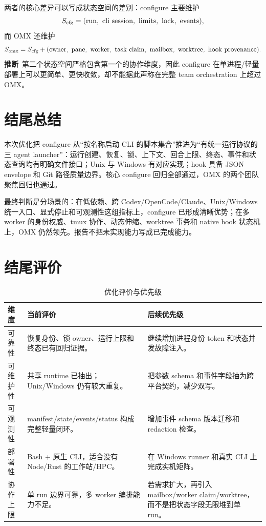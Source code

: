 \documentclass[UTF8,a4paper,11pt]{ctexart}
\newcommand{\inferred}{\textcolor{accent}{\textbf{推断}}}
\begin{document}
两者的核心差异可以写成状态空间的差别：configure 主要维护
\begin{equation}
  S_{\rm cfg}=({\rm run},\ {\rm cli\ session},\ {\rm limits},\ {\rm lock},\ {\rm events}),
\end{equation}
而 OMX 还维护
\begin{equation}
  S_{\rm omx}=S_{\rm cfg}+({\rm owner},\ {\rm pane},\ {\rm worker},\ {\rm task\ claim},\ {\rm mailbox},\ {\rm worktree},\ {\rm hook\ provenance}).
\end{equation}
\inferred\ 第二个状态空间严格包含第一个的协作维度，因此 configure 在单进程/轻量部署上可以更简单、更快收敛，却不能据此声称在完整 team orchestration 上超过 OMX。

\section{结尾总结}
本次优化把 configure 从“按名称启动 CLI 的脚本集合”推进为“有统一运行协议的三 agent launcher”：运行创建、恢复、锁、上下文、回合上限、终态、事件和状态查询均有明确文件接口；Unix 与 Windows 有对应实现；hook 具备 JSON envelope 和 Git 路径质量边界。核心 configure 回归全部通过，OMX 的两个团队聚焦回归也通过。

最终判断是分场景的：在低依赖、跨 Codex/OpenCode/Claude、Unix/Windows 统一入口、显式停止和可观测性这组指标上，configure 已形成清晰优势；在多 worker 的身份权威、tmux 协作、动态伸缩、worktree 事务和 native hook 状态机上，OMX 仍然领先。报告不把未实现能力写成已完成能力。

\section{结尾评价}
\begin{table}[htbp]
\centering
\caption{优化评价与优先级}
\small
\begin{tabularx}{\textwidth}{@{}>{\raggedright\arraybackslash}p{}>{\raggedright\arraybackslash}X>{\raggedright\arraybackslash}p{}@{}}
\toprule
维度 & 当前评价 & 后续优先级 \\
\midrule
可靠性 & 恢复身份、锁 owner、运行上限和终态已有回归证据。 & 继续增加进程身份 token 和状态并发故障注入。 \\
可维护性 & 共享 runtime 已抽出；Unix/Windows 仍有较大重复。 & 把参数 schema 和事件字段抽为跨平台契约，减少双写。 \\
可观测性 & manifest/state/events/status 构成完整轻量闭环。 & 增加事件 schema 版本迁移和 redaction 检查。 \\
部署性 & Bash + 原生 CLI，适合没有 Node/Rust 的工作站/HPC。 & 在 Windows runner 和真实 CLI 上完成实机矩阵。 \\
协作上限 & 单 run 边界可靠，多 worker 编排能力不足。 & 若需求扩大，再引入 mailbox/worker claim/worktree，而不是把状态字段无限堆到单 run。 \\
\bottomrule
\end{tabularx}
\end{table}
\end{document}
